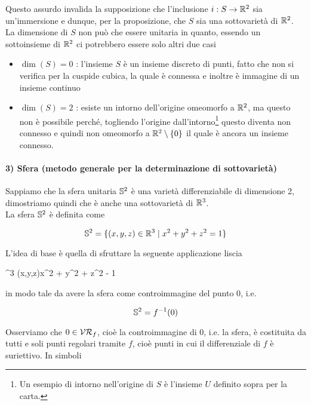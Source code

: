 Questo assurdo invalida la supposizione che l'inclusione $ i : S \to \R^{2} $ sia un'immersione e dunque, per la proposizione, che $ S $ sia una sottovarietà di $ \R^{2} $. \\
La dimensione di $ S $ non può che essere unitaria in quanto, essendo un sottoinsieme di $ \R^{2} $ ci potrebbero essere solo altri due casi

\begin{itemize}
	\item $ \dim(S)=0 $ : l'insieme $ S $ è un insieme discreto di punti, fatto che non si verifica per la cuspide cubica, la quale è connessa e inoltre è immagine di un insieme continuo
	
	\item $ \dim(S)=2 $ : esiste un intorno dell'origine omeomorfo a $ \R^{2} $, ma questo non è possibile perché, togliendo l'origine dall'intorno\footnote{%
		Un esempio di intorno nell'origine di $ S $ è l'insieme $ U $ definito sopra per la carta.%
	} questo diventa non connesso e quindi non omeomorfo a $ \R^{2} \setminus \{0\} $ il quale è ancora un insieme connesso.
\end{itemize}

\paragraph{3) Sfera (metodo generale per la determinazione di sottovarietà)}

Sappiamo che la sfera unitaria $ \S^{2} $ è una varietà differenziabile di dimensione 2, dimostriamo quindi che è anche una sottovarietà di $ \R^{3} $. \\
La sfera $ \S^{2} $ è definita come

\begin{equation}
	\S^{2} = \{ (x,y,z) \in \R^{3} \mid x^{2} + y^{2} + z^{2} = 1 \}
\end{equation}

L'idea di base è quella di sfruttare la seguente applicazione liscia

	{\R^{3}}{\R}
	{(x,y,z)}{x^{2} + y^{2} + z^{2} - 1}

in modo tale da avere la sfera come controimmagine del punto 0, i.e.

\begin{equation}
\S^{2} = f^{-1}(0)
\end{equation}

Osserviamo che $ 0 \in \VR_{f} $, cioè la controimmagine di 0, i.e. la sfera, è costituita da tutti e soli punti regolari tramite $ f $, cioè punti in cui il differenziale di $ f $ è suriettivo. In simboli

